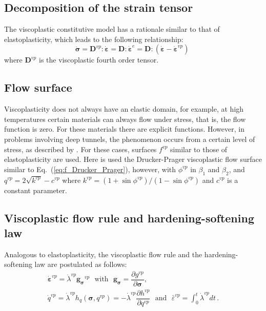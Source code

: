 \documentclass[Journal,letterpaper]{ascelike-new}
\newcommand{\dgds}{\boldsymbol{g_\sigma}}
\newcommand{\Dsdee}{\boldsymbol{D}}
\newcommand{\Dsdev}{\boldsymbol{D}^{vp}}
\newcommand{\dstrain}{\boldsymbol{\dot{\varepsilon}}}
\newcommand{\dstraine}{\boldsymbol{\dot{\varepsilon}}^{e}}
\newcommand{\dstrainv}{\boldsymbol{\dot{\varepsilon}}^{vp}}
\newcommand{\dstress}{\boldsymbol{\dot{\sigma}}}
\newcommand{\hl}{{h_q}}
\newcommand{\strainvpeq}{\bar \varepsilon^{vp}}
\newcommand{\stress}{\boldsymbol{\sigma}}
\begin{document}
\subsection{Decomposition of the strain tensor}

The viscoplastic constitutive model has a rationale similar to that of elastoplasticity, which leads to the following relationship:
\begin{equation} \label{eq_constitutive_relationship_viscoplastic}
	\dstress = \Dsdev : \dstrain = \Dsdee : \dstraine = \Dsdee : (\dstrain - \dstrainv)\;
\end{equation}
where $\Dsdev$ is the viscoplastic fourth order tensor.

\subsection{Flow surface}

Viscoplasticity does not always have an elastic domain, for example, at high temperatures certain materials can always flow under stress, that is, the flow function is zero. For these materials there are explicit functions. However, in problems involving deep tunnels, the phenomenon occurs from a certain level of stress, as described by . For these cases, surfaces $f^{vp}$ similar to those of elastoplasticity are used. Here is used the Drucker-Prager viscoplastic flow surface similar to Eq.~(\ref{eq:f_Drucker_Prager}), however, with $\phi^{vp}$ in $\beta_1$ and $\beta_2$, and $q^{vp} = 2\sqrt{k^{vp}}-c^{vp}$ where $k^{vp} = (1+\sin{\phi^{vp}})/(1-\sin{\phi^{vp}})$ and $c^{vp}$ is a constant parameter.

\subsection{Viscoplastic flow rule and hardening-softening law}

Analogous to elastoplasticity, the viscoplastic flow rule and the hardening-softening law are postulated as follows:
\begin{equation} \label{eq_plastic_flow_rule}
	\begin{array}{lcl}
		\dstrainv = \dot \lambda^{vp} \dgds^{vp} ~~~ \text{with} ~~~ \dgds = \dfrac{\partial g^{vp}}{\partial \stress}, \\ 
		\dot q^{vp} = \dot \lambda^{vp} \hl(\stress,q^{vp}) = - \dot \lambda^{vp} \dfrac{\partial h^{vp}}{\partial q^{vp}} ~~~\text{and} ~~~ \strainvpeq = \int_{0}^{t} \dot \lambda^{vp} dt  \,.
	\end{array}
\end{equation}
\end{document}
